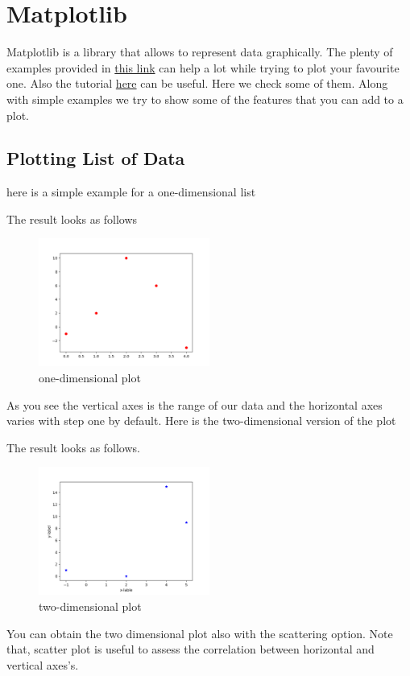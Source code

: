 \documentclass[10pt,a4paper]{article}
\begin{document}


\section{Matplotlib}
Matplotlib is a library that allows to represent data graphically. The plenty of examples provided in \href{https://matplotlib.org/gallery/index.html}{this link} can help a lot while trying to plot your favourite one. Also the tutorial \href{https://python-course.eu/matplotlib.php}{here} can be useful.
Here we check some of them. Along with simple examples we try to show some of the features that you can add to a plot.


\subsection{Plotting List of Data} \label{plot_list}
here is a simple example for a one-dimensional list

The result looks as follows
\begin{figure}[h]\centering \caption{one-dimensional plot}
\includegraphics[width=0.5\textwidth]{plot_list_data_1.png}
\end{figure}
As you see the vertical axes is the range of our data and the horizontal axes varies with step one by default. 
Here is the two-dimensional version of the plot

The result looks as follows. 
\begin{figure}[h]\centering \caption{two-dimensional plot}
\includegraphics[width=0.5\textwidth]{plot_list_data_2.png}
\end{figure}
You can obtain the two dimensional plot also with the scattering option. Note that, scatter plot is useful to assess the correlation between horizontal and vertical axes's.

\end{document}
